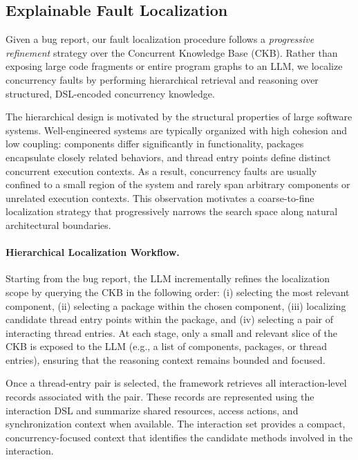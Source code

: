 \subsection{Explainable Fault Localization}
\label{sec:explainable-fl}

Given a bug report, our fault localization procedure follows a \emph{progressive refinement} strategy over the Concurrent Knowledge Base (CKB).
Rather than exposing large code fragments or entire program graphs to an LLM, we localize concurrency faults by performing hierarchical retrieval and reasoning over structured, DSL-encoded concurrency knowledge.

The hierarchical design is motivated by the structural properties of large software systems.
Well-engineered systems are typically organized with high cohesion and low coupling: components differ significantly in functionality, packages encapsulate closely related behaviors, and thread entry points define distinct concurrent execution contexts.
As a result, concurrency faults are usually confined to a small region of the system and rarely span arbitrary components or unrelated execution contexts.
This observation motivates a coarse-to-fine localization strategy that progressively narrows the search space along natural architectural boundaries.

\paragraph{Hierarchical Localization Workflow.}
Starting from the bug report, the LLM incrementally refines the localization scope by querying the CKB in the following order:
(i) selecting the most relevant component,
(ii) selecting a package within the chosen component,
(iii) localizing candidate thread entry points within the package, and
(iv) selecting a pair of interacting thread entries.
At each stage, only a small and relevant slice of the CKB is exposed to the LLM (e.g., a list of components, packages, or thread entries), ensuring that the reasoning context remains bounded and focused.

Once a thread-entry pair is selected, the framework retrieves all interaction-level records associated with the pair.
These records are represented using the interaction DSL and summarize shared resources, access actions, and synchronization context when available.
The interaction set provides a compact, concurrency-focused context that identifies the candidate methods involved in the interaction.

